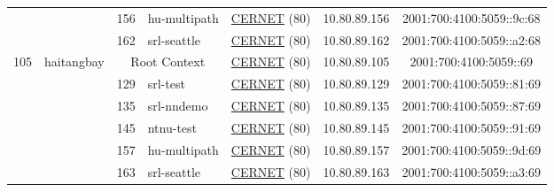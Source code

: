 \begin{small}
\begin{center}
\begin{longtable}{|c|c|c|c|c|c|c|c|}
  &  & \tiny{156} & \multicolumn{1}{|l|}{\tiny{hu-multipath}} & \multicolumn{2}{|c|}{\tiny{\href{http://www.cernet.edu.cn}{CERNET} (80)}} & \tiny{10.80.89.156} & \tiny{2001:700:4100:5059::9c:68} \\* \cline{3-3}\cline{4-4}\cline{5-5}\cline{6-6}\cline{7-7}\cline{8-8}
  &  & \tiny{162} & \multicolumn{1}{|l|}{\tiny{srl-seattle}} & \multicolumn{2}{|c|}{\tiny{\href{http://www.cernet.edu.cn}{CERNET} (80)}} & \tiny{10.80.89.162} & \tiny{2001:700:4100:5059::a2:68} \\ \hline
 \multirow{6}{*}{\tiny{105}} & \multicolumn{1}{|l|}{\multirow{6}{*}{\tiny{haitangbay}}} & \multicolumn{2}{|c|}{\tiny{Root Context}} & \multicolumn{2}{|c|}{\tiny{\href{http://www.cernet.edu.cn}{CERNET} (80)}} & \tiny{10.80.89.105} & \tiny{2001:700:4100:5059::69} \\* \cline{3-3}\cline{4-4}\cline{5-5}\cline{6-6}\cline{7-7}\cline{8-8}
  &  & \tiny{129} & \multicolumn{1}{|l|}{\tiny{srl-test}} & \multicolumn{2}{|c|}{\tiny{\href{http://www.cernet.edu.cn}{CERNET} (80)}} & \tiny{10.80.89.129} & \tiny{2001:700:4100:5059::81:69} \\* \cline{3-3}\cline{4-4}\cline{5-5}\cline{6-6}\cline{7-7}\cline{8-8}
  &  & \tiny{135} & \multicolumn{1}{|l|}{\tiny{srl-nndemo}} & \multicolumn{2}{|c|}{\tiny{\href{http://www.cernet.edu.cn}{CERNET} (80)}} & \tiny{10.80.89.135} & \tiny{2001:700:4100:5059::87:69} \\* \cline{3-3}\cline{4-4}\cline{5-5}\cline{6-6}\cline{7-7}\cline{8-8}
  &  & \tiny{145} & \multicolumn{1}{|l|}{\tiny{ntnu-test}} & \multicolumn{2}{|c|}{\tiny{\href{http://www.cernet.edu.cn}{CERNET} (80)}} & \tiny{10.80.89.145} & \tiny{2001:700:4100:5059::91:69} \\* \cline{3-3}\cline{4-4}\cline{5-5}\cline{6-6}\cline{7-7}\cline{8-8}
  &  & \tiny{157} & \multicolumn{1}{|l|}{\tiny{hu-multipath}} & \multicolumn{2}{|c|}{\tiny{\href{http://www.cernet.edu.cn}{CERNET} (80)}} & \tiny{10.80.89.157} & \tiny{2001:700:4100:5059::9d:69} \\* \cline{3-3}\cline{4-4}\cline{5-5}\cline{6-6}\cline{7-7}\cline{8-8}
  &  & \tiny{163} & \multicolumn{1}{|l|}{\tiny{srl-seattle}} & \multicolumn{2}{|c|}{\tiny{\href{http://www.cernet.edu.cn}{CERNET} (80)}} & \tiny{10.80.89.163} & \tiny{2001:700:4100:5059::a3:69} \\ \hline
\end{longtable}
\end{center}
\end{small}



